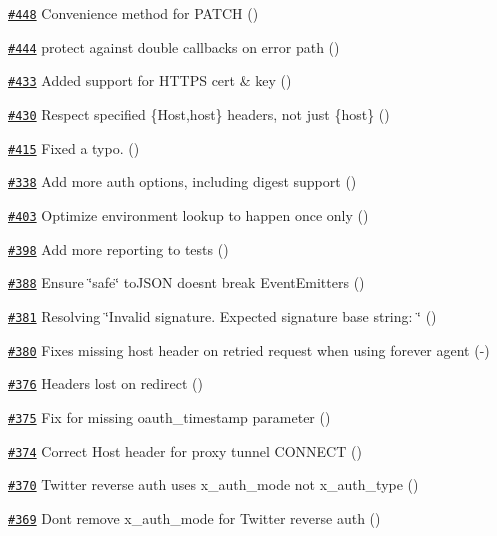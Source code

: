 \begin{DoxyItemize}
\item \href{https://github.com/request/request/pull/448}{\tt \#448} Convenience method for P\+A\+T\+CH ()
\item \href{https://github.com/request/request/pull/444}{\tt \#444} protect against double callbacks on error path ()
\item \href{https://github.com/request/request/pull/433}{\tt \#433} Added support for H\+T\+T\+PS cert \& key ()
\item \href{https://github.com/request/request/pull/430}{\tt \#430} Respect specified \{Host,host\} headers, not just \{host\} ()
\item \href{https://github.com/request/request/pull/415}{\tt \#415} Fixed a typo. ()
\item \href{https://github.com/request/request/pull/338}{\tt \#338} Add more auth options, including digest support ()
\item \href{https://github.com/request/request/pull/403}{\tt \#403} Optimize environment lookup to happen once only ()
\item \href{https://github.com/request/request/pull/398}{\tt \#398} Add more reporting to tests ()
\item \href{https://github.com/request/request/pull/388}{\tt \#388} Ensure \char`\"{}safe\char`\"{} to\+J\+S\+ON doesn\textquotesingle{}t break Event\+Emitters ()
\item \href{https://github.com/request/request/pull/381}{\tt \#381} Resolving \char`\"{}\+Invalid signature. Expected signature base string\+: \char`\"{} ()
\item \href{https://github.com/request/request/pull/380}{\tt \#380} Fixes missing host header on retried request when using forever agent (-\/)
\item \href{https://github.com/request/request/pull/376}{\tt \#376} Headers lost on redirect ()
\item \href{https://github.com/request/request/pull/375}{\tt \#375} Fix for missing oauth\+\_\+timestamp parameter ()
\item \href{https://github.com/request/request/pull/374}{\tt \#374} Correct Host header for proxy tunnel C\+O\+N\+N\+E\+CT ()
\item \href{https://github.com/request/request/pull/370}{\tt \#370} Twitter reverse auth uses x\+\_\+auth\+\_\+mode not x\+\_\+auth\+\_\+type ()
\item \href{https://github.com/request/request/pull/369}{\tt \#369} Don\textquotesingle{}t remove x\+\_\+auth\+\_\+mode for Twitter reverse auth ()

\end{DoxyItemize}
